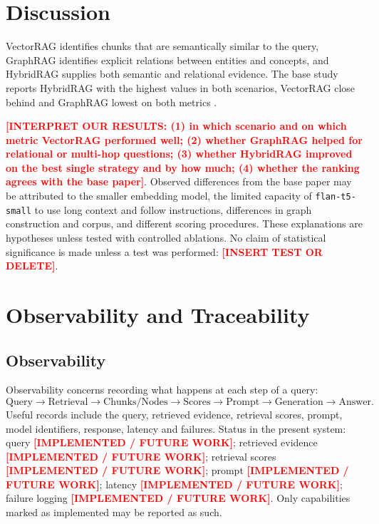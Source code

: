 \documentclass[conference]{IEEEtran}
\newcommand{\ph}[1]{\textbf{\textcolor{red}{[#1]}}}
\begin{document}
\section{Discussion}
VectorRAG identifies chunks that are semantically similar to the query, GraphRAG identifies explicit relations between entities and concepts, and HybridRAG supplies both semantic and relational evidence. The base study reports HybridRAG with the highest values in both scenarios, VectorRAG close behind and GraphRAG lowest on both metrics \cite{ghanadian2026base}.

\ph{INTERPRET OUR RESULTS: (1) in which scenario and on which metric VectorRAG performed well; (2) whether GraphRAG helped for relational or multi-hop questions; (3) whether HybridRAG improved on the best single strategy and by how much; (4) whether the ranking agrees with the base paper}. Observed differences from the base paper may be attributed to the smaller embedding model, the limited capacity of \texttt{flan-t5-small} to use long context and follow instructions, differences in graph construction and corpus, and different scoring procedures. These explanations are hypotheses unless tested with controlled ablations. No claim of statistical significance is made unless a test was performed: \ph{INSERT TEST OR DELETE}.

\section{Observability and Traceability}
\subsection{Observability}
Observability concerns recording what happens at each step of a query:
\begin{equation*}
\text{Query}\rightarrow\text{Retrieval}\rightarrow\text{Chunks/Nodes}\rightarrow\text{Scores}\rightarrow\text{Prompt}\rightarrow\text{Generation}\rightarrow\text{Answer}.
\end{equation*}
Useful records include the query, retrieved evidence, retrieval scores, prompt, model identifiers, response, latency and failures. Status in the present system: query \ph{IMPLEMENTED / FUTURE WORK}; retrieved evidence \ph{IMPLEMENTED / FUTURE WORK}; retrieval scores \ph{IMPLEMENTED / FUTURE WORK}; prompt \ph{IMPLEMENTED / FUTURE WORK}; latency \ph{IMPLEMENTED / FUTURE WORK}; failure logging \ph{IMPLEMENTED / FUTURE WORK}. Only capabilities marked as implemented may be reported as such.
\end{document}
